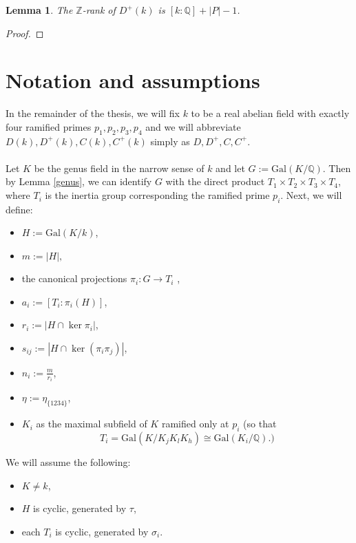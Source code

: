 \documentclass[12pt,a4paper]{article}
\newtheorem{lemma}[theorem]{Lemma}
\theoremstyle{definition}
\newcommand{\Q}{\mathbb{Q}}
\newcommand{\Z}{\mathbb{Z}}
\newcommand{\Gal}{\mathrm{Gal}}
\begin{document}
\begin{lemma}
The $\Z$-rank of $D^+(k)$ is $[k:\Q]+|P|-1$.
\end{lemma}
\begin{proof}
\end{proof}

\section{Notation and assumptions}
In the remainder of the thesis, we will fix $k$ to be a real abelian field with exactly four ramified primes $p_1,p_2,p_3,p_4$ and we will abbreviate $D(k),D^{+}(k),C(k),C^+(k)$ simply as $D,D^{+},C,C^+$.
\paragraph*{}

 Let $K$ be the genus field in the narrow sense of $k$ and let $G:=\Gal(K/\Q)$. Then by Lemma \ref{genus}, we can identify $G$ with the direct product $T_1\times T_2\times T_3\times T_4$, where $T_i$ is the inertia group corresponding the ramified prime $p_i$. Next, we will define:

\begin{itemize}
\item $H:=\Gal(K/k)$, 
\item $m:=|H|,$
\item the canonical projections $\pi_i:G\to T_i$ ,
\item $a_i:=[T_i:\pi_i(H)]$,
\item $r_i:=|H\cap \ker \pi_i|$,
\item $s_{ij}:=|H\cap \ker (\pi_i\pi_j)|$,
\item $n_i:=\frac{m}{r_i}$,
\item $\eta:=\eta_{\{1234\}}$,
\item $K_i$ as the maximal subfield of $K$ ramified only at $p_i$ (so that $$T_i=\Gal(K/K_jK_lK_h)\cong \Gal(K_i/\Q).)$$
\end{itemize}

We will assume the following:
\begin{itemize}
\item $K\neq k$,
\item $H$ is cyclic, generated by $\tau$,
\item each $T_i$ is cyclic, generated by $\sigma_i$.
\end{itemize}
\end{document}
